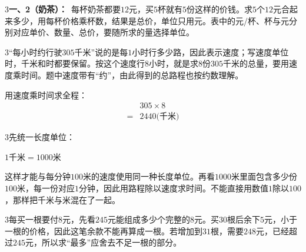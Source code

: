 \documentclass[multi=snippet,border={5bp 20bp 5bp 5bp}]{standalone}
\newenvironment{snippet}[3]{\begin{minipage}{#1bp}\color{answerred}\fontsize{#2}{#3}\selectfont\raggedright}{\end{minipage}}
\begin{document}
\begin{snippet}{505}{11.5}{14}\begin{multicols}{3}\raggedcolumns \textbf{一、2（奶茶）：}\ 每杯奶茶都要\(12\)\allowbreak 元，买\(5\)\allowbreak 杯就有\(5\)\allowbreak 份这样的价钱。求\(5\)\allowbreak 个\(12\)\allowbreak 元合起来多少，用每杯价格乘杯数，结果是总价，单位只用元。表中的元/杯、杯与元分别对应单价、数量、总价，要随所求的量选择单位。\end{multicols}\end{snippet}
\begin{snippet}{505}{11.5}{14}\begin{multicols}{3}\raggedcolumns “每小时约行驶\(305\)\allowbreak 千米”说的是每\(1\)\allowbreak 小时行多少路，因此表示速度；写速度单位时，千米和时都要保留。按这个速度行\(8\)\allowbreak 小时，就是求\(8\)\allowbreak 份\(305\)\allowbreak 千米的总量，要用速度乘时间。题中速度带有“约”，由此得到的总路程也按约数理解。\par 用速度乘时间求全程：\[\begin{aligned}&305\times8\\={}&2440\text{(千米)}\end{aligned}\]\end{multicols}\end{snippet}
\begin{snippet}{505}{11.5}{14}\begin{multicols}{3}\raggedcolumns 先统一长度单位：\par\noindent\(\displaystyle 1\text{千米}=1000\text{米}\)\allowbreak \par 这样才能与每分钟\(100\)\allowbreak 米的速度使用同一种长度单位。再看\(1000\)\allowbreak 米里面包含多少份\(100\)\allowbreak 米，每一份对应\(1\)\allowbreak 分钟，因此用路程除以速度求时间。不能直接用数值\(1\)\allowbreak 除以\(100\)\allowbreak ，那样把千米与米混在了一起。\end{multicols}\end{snippet}
\begin{snippet}{505}{11.5}{14}\begin{multicols}{3}\raggedcolumns 每买一根要付\(8\)\allowbreak 元，先看\(245\)\allowbreak 元能组成多少个完整的\(8\)\allowbreak 元。买\(30\)\allowbreak 根后余下\(5\)\allowbreak 元，小于一根的价格，因此这笔余款不能再算成一根。若增加到\(31\)\allowbreak 根，需要\(248\)\allowbreak 元，已经超过\(245\)\allowbreak 元，所以求“最多”应舍去不足一根的部分。\end{multicols}\end{snippet}
\end{document}
